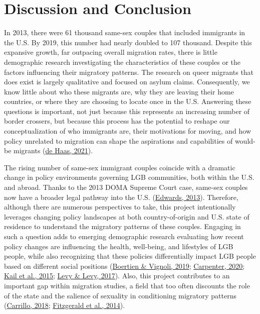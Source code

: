 \documentclass[
  11pt,
]{article}
\begin{document}
\hypertarget{discussion-and-conclusion}{%
\section{Discussion and Conclusion}\label{discussion-and-conclusion}}

In 2013, there were 61 thousand same-sex couples that included immigrants in the U.S. By 2019, this number had nearly doubled to 107 thousand. Despite this expansive growth, far outpacing overall migration rates, there is little demographic research investigating the characteristics of these couples or the factors influencing their migratory patterns. The research on queer migrants that does exist is largely qualitative and focused on asylum claims. Consequently, we know little about who these migrants are, why they are leaving their home countries, or where they are choosing to locate once in the U.S. Answering these questions is important, not just because this represents an increasing number of border crossers, but because this process has the potential to reshape our conceptualization of who immigrants are, their motivations for moving, and how policy unrelated to migration can shape the aspirations and capabilities of would-be migrants (\protect\hyperlink{ref-dehaas_2021}{de Haas, 2021}).

The rising number of same-sex immigrant couples coincide with a dramatic change in policy environments governing LGB communities, both within the U.S. and abroad. Thanks to the 2013 DOMA Supreme Court case, same-sex couples now have a broader legal pathway into the U.S. (\protect\hyperlink{ref-edwards_2013}{Edwards, 2013}). Therefore, although there are numerous perspectives to take, this project intentionally leverages changing policy landscapes at both country-of-origin and U.S. state of residence to understand the migratory patterns of these couples. Engaging in such a question adds to emerging demographic research evaluating how recent policy changes are influencing the health, well-being, and lifestyles of LGB people, while also recognizing that these policies differentially impact LGB people based on different social positions (\protect\hyperlink{ref-boertien_2019}{Boertien \& Vignoli, 2019}; \protect\hyperlink{ref-carpenter_2020}{Carpenter, 2020}; \protect\hyperlink{ref-kail_2015}{Kail et al., 2015}; \protect\hyperlink{ref-levy_2017}{Levy \& Levy, 2017}). Also, this project contributes to an important gap within migration studies, a field that too often discounts the role of the state and the salience of sexuality in conditioning migratory patterns (\protect\hyperlink{ref-carrillo_2018}{Carrillo, 2018}; \protect\hyperlink{ref-fitzgerald_2014}{Fitzgerald et al., 2014}).
\end{document}
